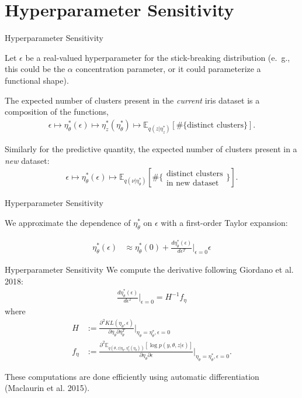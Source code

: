 \documentclass[10pt]{beamer}\usepackage[]{graphicx}\usepackage[]{color}
\newcommand{\Expect}{\mathbb{E}}
\newcommand{\etazopt}{\eta_z^{*}}
\newcommand{\etathetaopt}{\eta_\theta^{*}}
\newcommand{\QExpect}
{\Expect_{q\left(\theta, z \vert \eta_\theta, \etazopt(\eta_\theta)\right)}}
\newcommand{\atzero}{\Big\rvert_{\eta_\theta = \etathetaopt, \epsilon = 0}}
\begin{document}
\section{Hyperparameter Sensitivity}

\begin{frame}{Hyperparameter Sensitivity}

Let $\epsilon$ be a real-valued hyperparameter for the stick-breaking distribution
(e.\ g., this could be the $\alpha$ concentration parameter, or it could parameterize a functional shape).

\pause

The expected number of clusters present in the {\itshape current} iris dataset is a composition of the functions,
\begin{align*}
  \epsilon \mapsto
  \etathetaopt(\epsilon) \mapsto
  \etazopt\left(\etathetaopt\right) \mapsto
  \Expect_{q(z | \etazopt)} \left[ \#\{\text{distinct clusters}\} \right].
\end{align*}

\pause

Similarly for the predictive quantity, the expected number of clusters present in a {\itshape new} dataset:
\begin{align*}
  \epsilon \mapsto
  \etathetaopt(\epsilon) \mapsto
  \Expect_{q(\nu \vert \etathetaopt)}
  \left[\#\{\substack{\text{distinct clusters}\\\text{in new dataset}}\} \right].
\end{align*}


\end{frame}

\begin{frame}{Hyperparameter Sensitivity}

We approximate the dependence of $\etathetaopt$ on $\epsilon$ with a first-order
Taylor expansion:

\begin{align*}
  \etathetaopt(\epsilon)  &\approx  \etathetaopt(0) +
  \frac{d \etathetaopt(\epsilon)}{d\epsilon^T}\Big|_{\epsilon=0} \epsilon
\end{align*}
\end{frame}


\begin{frame}{Hyperparameter Sensitivity}
We compute the derivative following Giordano et al. 2018:
\begin{align*}
\frac{d \etathetaopt(\epsilon)}{d\epsilon^T}\Big|_{\epsilon=0} = H^{-1}f_\eta
\end{align*}
where
\begin{align*}
  H &:= \frac{\partial^2 KL(\eta_\theta, \epsilon) }{
      \partial \eta_\theta \partial \eta_\theta^T}
      \atzero
\\
  f_\eta &:= \frac{\partial^2
      \QExpect \left[ \log p\left(y, \theta, z \vert \epsilon \right) \right]}{\partial \eta_\theta \partial \epsilon}
      \atzero.
\end{align*}

These computations are done efficiently using automatic differentiation (Maclaurin et al. 2015). 

\end{frame}
\end{document}
